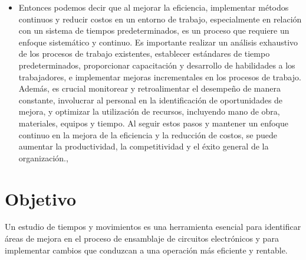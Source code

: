     \begin{itemize}
    \item Entonces podemos decir que al mejorar la eficiencia, implementar métodos continuos y reducir costos en un entorno de trabajo, especialmente en relación con un sistema de tiempos predeterminados, es un proceso que requiere un enfoque sistemático y continuo. Es importante realizar un análisis exhaustivo de los procesos de trabajo existentes, establecer estándares de tiempo predeterminados, proporcionar capacitación y desarrollo de habilidades a los trabajadores, e implementar mejoras incrementales en los procesos de trabajo.
    Además, es crucial monitorear y retroalimentar el desempeño de manera constante, involucrar al personal en la identificación de oportunidades de mejora, y optimizar la utilización de recursos, incluyendo mano de obra, materiales, equipos y tiempo. Al seguir estos pasos y mantener un enfoque continuo en la mejora de la eficiencia y la reducción de costos, se puede aumentar la productividad, la competitividad y el éxito general de la organización.\cite{Niebel}, \cite{Peacock}
    \end{itemize}
    
    
    \section{Objetivo}
    Un estudio de tiempos y movimientos es una herramienta esencial para identificar áreas de mejora en el proceso de ensamblaje de circuitos electrónicos y para implementar cambios que conduzcan a una operación más eficiente y rentable.
    
